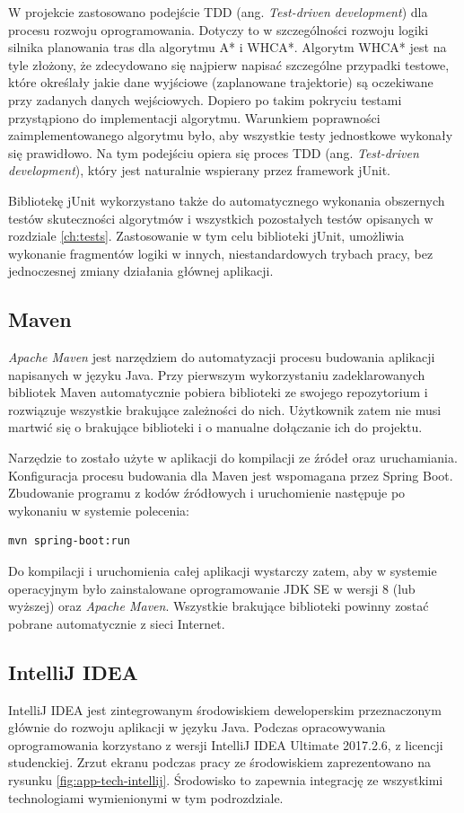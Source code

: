 W projekcie zastosowano podejście TDD (ang. {\it Test-driven development}) dla procesu rozwoju oprogramowania. Dotyczy to w szczególności rozwoju logiki silnika planowania tras dla algorytmu A* i WHCA*. Algorytm WHCA* jest na tyle złożony, że zdecydowano się najpierw napisać szczególne przypadki testowe, które określały jakie dane wyjściowe (zaplanowane trajektorie) są oczekiwane przy zadanych danych wejściowych. Dopiero po takim pokryciu testami przystąpiono do implementacji algorytmu. Warunkiem poprawności zaimplementowanego algorytmu było, aby wszystkie testy jednostkowe wykonały się prawidłowo. Na tym podejściu opiera się proces TDD (ang. {\it Test-driven development}), który jest naturalnie wspierany przez framework jUnit.

Bibliotekę jUnit wykorzystano także do automatycznego wykonania obszernych testów skuteczności algorytmów i wszystkich pozostałych testów opisanych w rozdziale \ref{ch:tests}. Zastosowanie w tym celu biblioteki jUnit, umożliwia wykonanie fragmentów logiki w innych, niestandardowych trybach pracy, bez jednoczesnej zmiany działania głównej aplikacji.

\subsection{Maven}
{\it Apache Maven} jest narzędziem do automatyzacji procesu budowania aplikacji napisanych w języku Java.
Przy pierwszym wykorzystaniu zadeklarowanych bibliotek Maven automatycznie pobiera biblioteki ze swojego repozytorium i rozwiązuje wszystkie brakujące zależności do nich. Użytkownik zatem nie musi martwić się o brakujące biblioteki i o manualne dołączanie ich do projektu.

Narzędzie to zostało użyte w aplikacji do kompilacji ze źródeł oraz uruchamiania. Konfiguracja procesu budowania dla Maven jest wspomagana przez Spring Boot. Zbudowanie programu z kodów źródłowych i uruchomienie następuje po wykonaniu w systemie polecenia:
\begin{lstlisting}[language=bash]
mvn spring-boot:run
\end{lstlisting}
Do kompilacji i uruchomienia całej aplikacji wystarczy zatem, aby w systemie operacyjnym było zainstalowane oprogramowanie JDK SE w wersji 8 (lub wyższej) oraz {\it Apache Maven}. Wszystkie brakujące biblioteki powinny zostać pobrane automatycznie z sieci Internet.

\subsection{IntelliJ IDEA}
IntelliJ IDEA jest zintegrowanym środowiskiem deweloperskim przeznaczonym głównie do rozwoju aplikacji w języku Java.
Podczas opracowywania oprogramowania korzystano z wersji IntelliJ IDEA Ultimate 2017.2.6, z licencji studenckiej. Zrzut ekranu podczas pracy ze środowiskiem zaprezentowano na rysunku \ref{fig:app-tech-intellij}.
Środowisko to zapewnia integrację ze wszystkimi technologiami wymienionymi w tym podrozdziale.


